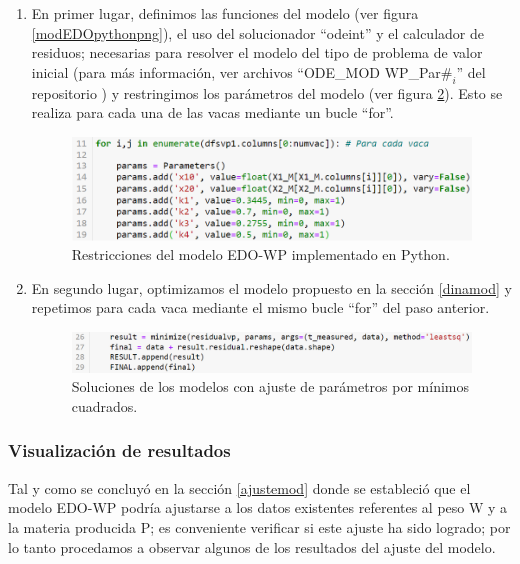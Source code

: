 \begin{enumerate} 
    \item En primer lugar, definimos las funciones del modelo (ver figura \ref{modEDOpythonpng}), el uso del solucionador ``odeint'' y el calculador de residuos; necesarias para resolver el modelo del tipo de problema de valor inicial (para más información, ver archivos ``ODE\_MOD WP\_Par$\#_{i}$'' del repositorio \cite{msclfggrepo}) y restringimos los parámetros del modelo (ver figura \ref{paramsaddpng}). Esto se realiza para cada una de las vacas mediante un bucle ``for''.
  
        \begin{figure}[H]
            \centering
            \includegraphics[width=\textwidth]{img/paramsadd.png}
            \caption{Restricciones del modelo EDO-WP implementado en Python.}
            \label{paramsaddpng}
        \end{figure}
        
    \item En segundo lugar, optimizamos el modelo propuesto en la sección \ref{dinamod} y repetimos para cada vaca mediante el mismo bucle ``for'' del paso anterior.
    
        \begin{figure}[H]
            \centering
            \includegraphics[width=\textwidth]{img/minimizefor.png}
            \caption{Soluciones de los modelos con ajuste de parámetros por mínimos cuadrados.}
            \label{paramsaddpng}
        \end{figure}
        
\end{enumerate}

\subsubsection{Visualización de resultados}

Tal y como se concluyó en la sección \ref{ajustemod} donde se estableció que el modelo EDO-WP podría ajustarse a los datos existentes referentes al peso W y a la materia producida P; es conveniente verificar si este ajuste ha sido logrado; por lo tanto procedamos a observar algunos de los resultados del ajuste del modelo.

